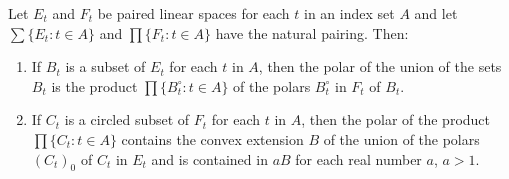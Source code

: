 Let $E_t$ and $F_t$ be paired linear spaces for each $t$ in an index set $A$ and let $\sum \{E_t: t \in A\}$ and $\prod \{F_t: t \in A\}$ have the natural pairing. Then:

\begin{enumerate}
\item[(i)] If $B_t$ is a subset of $E_t$ for each $t$ in $A$, then the polar of the union of the sets $B_t$ is the product $\prod \{B_t^\circ: t \in A\}$ of the polars $B_t^\circ$ in $F_t$ of $B_t$.

\item[(ii)] If $C_t$ is a circled subset of $F_t$ for each $t$ in $A$, then the polar of the product $\prod \{C_t: t \in A\}$ contains the convex extension $B$ of the union of the polars $(C_t)_0$ of $C_t$ in $E_t$ and is contained in $aB$ for each real number $a$, $a > 1$.
\end{enumerate}
